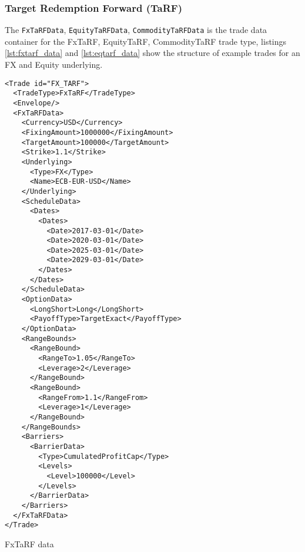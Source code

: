 \subsubsection{Target Redemption Forward (TaRF)}

The \verb+FxTaRFData+, \verb+EquityTaRFData+, \verb+CommodityTaRFData+ is the trade data container for the FxTaRF,
EquityTaRF, CommodityTaRF trade type, listings \ref{lst:fxtarf_data} and \ref{lst:eqtarf_data} show the structure of
example trades for an FX and Equity underlying.

\begin{listing}[H]
\begin{verbatim}
<Trade id="FX_TARF">
  <TradeType>FxTaRF</TradeType>
  <Envelope/>
  <FxTaRFData>
    <Currency>USD</Currency>
    <FixingAmount>1000000</FixingAmount>
    <TargetAmount>100000</TargetAmount>
    <Strike>1.1</Strike>
    <Underlying>
      <Type>FX</Type>
      <Name>ECB-EUR-USD</Name>
    </Underlying>
    <ScheduleData>
      <Dates>
        <Dates>
          <Date>2017-03-01</Date>
          <Date>2020-03-01</Date>
          <Date>2025-03-01</Date>
          <Date>2029-03-01</Date>
        </Dates>
      </Dates>
    </ScheduleData>
    <OptionData>
      <LongShort>Long</LongShort>
      <PayoffType>TargetExact</PayoffType>
    </OptionData>
    <RangeBounds>
      <RangeBound>
        <RangeTo>1.05</RangeTo>
        <Leverage>2</Leverage>
      </RangeBound>
      <RangeBound>
        <RangeFrom>1.1</RangeFrom>
        <Leverage>1</Leverage>
      </RangeBound>
    </RangeBounds>
    <Barriers>
      <BarrierData>
        <Type>CumulatedProfitCap</Type>
        <Levels>
          <Level>100000</Level>
        </Levels>
      </BarrierData>
    </Barriers>
  </FxTaRFData>
</Trade>
\end{verbatim}
\caption{FxTaRF data}
\label{lst:fxtarf_data}
\end{listing}

